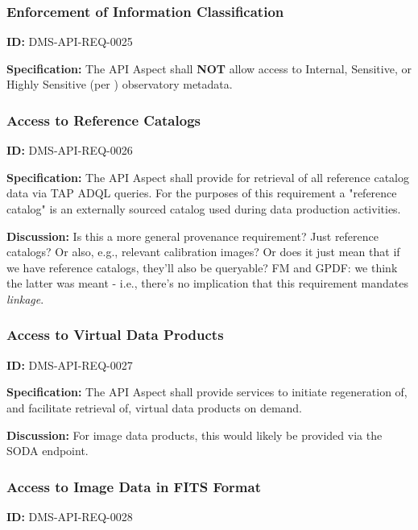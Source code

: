 \documentclass[SE,toc,lsstdraft]{lsstdoc}
\begin{document}
\subsubsection{Enforcement of Information Classification}

\label{DMS-API-REQ-0025}
\textbf{ID:} DMS-API-REQ-0025

\textbf{Specification:}
The API Aspect shall \textbf{NOT} allow access to Internal, Sensitive, or Highly Sensitive (per ) observatory metadata.

\subsubsection{Access to Reference Catalogs}

\label{DMS-API-REQ-0026}
\textbf{ID:} DMS-API-REQ-0026

\textbf{Specification:}
The API Aspect shall provide for retrieval of all reference catalog data via TAP ADQL queries.  For the purposes of this requirement a "reference catalog" is an externally sourced catalog used during data production activities.

\textbf{Discussion:}
Is this a more general provenance requirement? Just reference catalogs? Or also, e.g., relevant calibration images? Or does it just mean that if we have reference catalogs, they'll also be queryable? FM and GPDF: we think the latter was meant - i.e., there's no implication that this requirement mandates \textit{linkage}.

\subsubsection{Access to Virtual Data Products}

\label{DMS-API-REQ-0027}
\textbf{ID:} DMS-API-REQ-0027

\textbf{Specification:}
The API Aspect shall provide services to initiate regeneration of, and facilitate retrieval of, virtual data products on demand.

\textbf{Discussion:}
For image data products, this would likely be provided via the SODA endpoint.

\subsubsection{Access to Image Data in FITS Format}

\label{DMS-API-REQ-0028}
\textbf{ID:} DMS-API-REQ-0028
\end{document}
